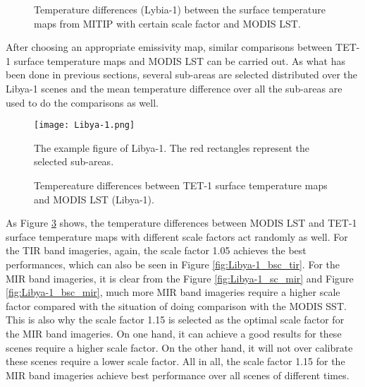 \begin{figure}[!htbp]
\centering
{}
\hspace{0.5in}
\caption{Temperature differences (Lybia-1) between the surface temperature maps from MITIP with certain scale factor and MODIS LST.}
\label{fig:diff_emi_Lybia2}
\end{figure}

\noindent After choosing an appropriate emissivity map, similar comparisons between TET-1 surface temperature maps and MODIS LST can be carried out. As what has been done in previous sections, several sub-areas are selected distributed over the Libya-1 scenes and the mean temperature difference over all the sub-areas are used to do the comparisons as well.\\

\begin{figure}[!htbp]
\centering
\texttt{[image: Libya-1.png]}
\caption{The example figure of Libya-1. The red rectangles represent the selected sub-areas.}
\label{fig:Libya1_sub_areas}
\end{figure}

\begin{figure}[!htbp]
\centering
{}
\hspace{0.5in}
\caption{Tempereature differences between TET-1 surface temperature maps and MODIS LST (Libya-1).}
\label{fig:Libya-1_sc_mir_tir}
\end{figure}

\noindent As Figure \ref{fig:Libya-1_sc_mir_tir} shows, the temperature differences between MODIS LST and TET-1 surface temperature maps with different scale factors act randomly as well. For the TIR band imageries, again, the scale factor 1.05 achieves the best performances, which can also be seen in Figure \ref{fig:Libya-1_bsc_tir}. For the MIR band imageries, it is clear from the Figure \ref{fig:Libya-1_sc_mir} and Figure \ref{fig:Libya-1_bsc_mir}, much more MIR band imageries require a higher scale factor compared with the situation of doing comparison with the MODIS SST. This is also why the scale factor 1.15 is selected as the optimal scale factor for the MIR band imageries. On one hand, it can achieve a good results for these scenes require a higher scale factor. On the other hand, it will not over calibrate these scenes require a lower scale factor. All in all, the scale factor 1.15 for the MIR band imageries achieve best performance over all scenes of different times.\\

